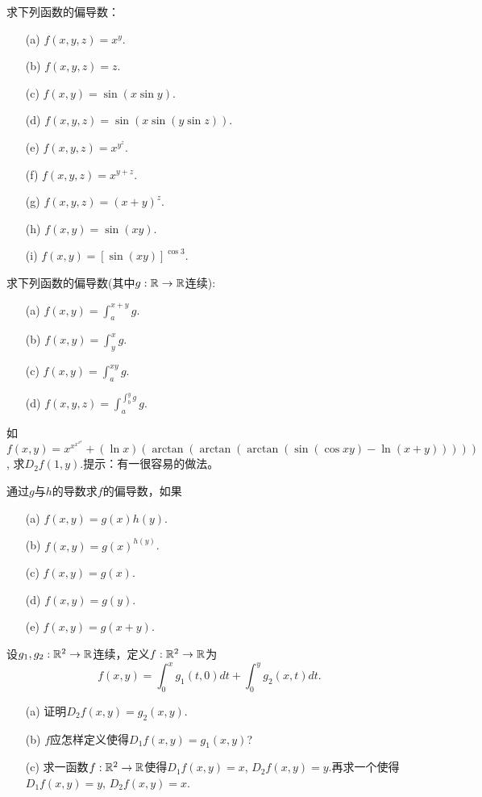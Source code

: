 \begin{problemset}
\item\label{exer009020217} 求下列函数的偏导数：
\begin{enumerate}
\item[(a)] $f(x, y, z) = x^y$.
\item[(b)] $f(x, y, z) = z$.
\item[(c)] $f(x, y) = \sin(x\sin{y})$.
\item[(d)] $f(x, y, z) = \sin(x\sin(y\sin{z}))$.
\item[(e)] $f(x, y, z) = x^{y^z}$.
\item[(f)] $f(x, y, z) = x^{y+z}$.
\item[(g)] $f(x, y, z) = (x + y)^z$.
\item[(h)] $f(x, y) = \sin(xy)$.
\item[(i)] $f(x, y) = [\sin(xy)]^{\cos{3}}$.
\end{enumerate}

\item 求下列函数的偏导数(其中$g:\mathbb{R}\to\mathbb{R}$连续):
\begin{enumerate}
\item[(a)] $f(x, y) = \int_{a}^{x+y}{g}$.
\item[(b)] $f(x, y) = \int_{y}^{x}{g}$.
\item[(c)] $f(x, y) = \int_{a}^{xy}{g}$.
\item[(d)] $f(x, y, z) = \int_{a}^{\int_{b}^{y}{g}}{g}$.
\end{enumerate}

\item 如$f(x, y) = x^{x^{x^{x^y}}} + (\ln{x})(\arctan(\arctan(\arctan(\sin(\cos{xy}) - \ln(x+y)))))$, 求$D_2f(1, y)$.提示：有一很容易的做法。

\item 通过$g$与$h$的导数求$f$的偏导数，如果
\begin{enumerate}
\item[(a)] $f(x, y) = g(x)h(y)$.
\item[(b)] $f(x, y) = g(x)^{h(y)}$.
\item[(c)] $f(x, y) = g(x)$.
\item[(d)] $f(x, y) = g(y)$.
\item[(e)] $f(x, y) = g(x + y)$.
\end{enumerate}

\item 设$g_1, g_2: \mathbb{R}^2 \to \mathbb{R}$连续，定义$f:\mathbb{R}^2 \to \mathbb{R}$为
\[
f(x, y) = \int_{0}^{x}{g_1(t, 0)dt} + \int_{0}^{y}{g_2(x, t)dt}.
\]
\begin{enumerate}
\item[(a)] 证明$D_2f(x,y) = g_2(x, y)$.
\item[(b)] $f$应怎样定义使得$D_1f(x, y) = g_1(x, y)$?
\item[(c)] 求一函数$f:\mathbb{R}^2 \to \mathbb{R}$使得$D_1f(x, y) = x$, $D_2f(x, y) = y$.再求一个使得$D_1f(x, y) = y$, $D_2f(x, y) = x$.
\end{enumerate}

\end{problemset}


